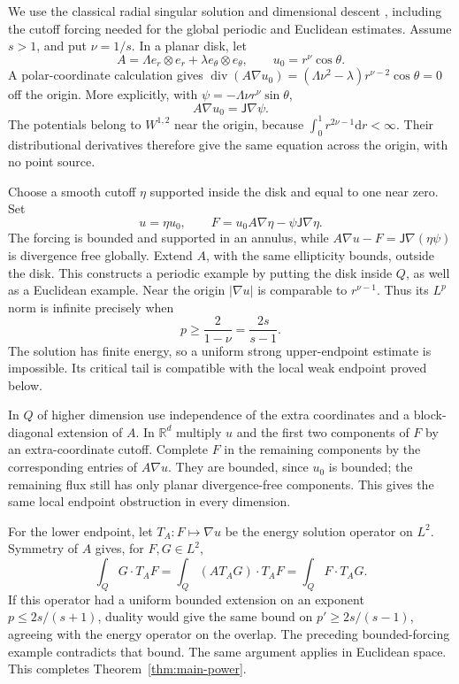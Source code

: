 \documentclass[11pt,a4paper]{article}
\numberwithin{equation}{section}
\theoremstyle{definition}
\theoremstyle{remark}\newtheorem{remark}[theorem]{Remark}
\DeclareMathOperator{\diver}{div}
\newcommand{\R}{\mathbb R}
\newcommand{\Rot}{\mathsf J}
\begin{document}
We use the classical radial singular solution and dimensional descent
\cite[Section~5]{Meyers1963}, including the cutoff forcing needed for
the global periodic and Euclidean estimates.
Assume \(s>1\), and put \(\nu=1/s\). In a planar disk, let
\[
 A=\Lambda e_r\otimes e_r+\lambda e_\theta\otimes e_\theta,
 \qquad u_0=r^\nu\cos\theta.
\]
A polar-coordinate calculation gives
\(\diver(A\nabla u_0)=
(\Lambda\nu^2-\lambda)r^{\nu-2}\cos\theta=0\)
off the origin. More explicitly, with
\(\psi=-\Lambda\nu r^\nu\sin\theta\),
\[
 A\nabla u_0=\Rot\nabla\psi.
\]
The potentials belong to \(W^{1,2}\) near the origin, because
\(\int_0^1r^{2\nu-1}\mathrm dr<\infty\).
Their distributional derivatives therefore give the same equation
across the origin, with no point source.

Choose a smooth cutoff \(\eta\) supported inside the disk and equal
to one near zero. Set
\begin{equation}\label{eq:endpoint-forcing}
 u=\eta u_0,\qquad
 F=u_0A\nabla\eta-\psi\Rot\nabla\eta.
\end{equation}
The forcing is bounded and supported in an annulus, while
\(A\nabla u-F=\Rot\nabla(\eta\psi)\) is divergence free globally.
Extend \(A\), with the same ellipticity bounds, outside the disk.
This constructs a periodic example by putting the disk inside \(Q\),
as well as a Euclidean example.
Near the origin \(|\nabla u|\) is comparable to \(r^{\nu-1}\).
Thus its \(L^p\) norm is infinite precisely when
\[
 p\geq\frac2{1-\nu}=\frac{2s}{s-1}.
\]
The solution has finite energy, so a uniform strong upper-endpoint
estimate is impossible. Its critical tail is compatible with the
local weak endpoint proved below.

In \(Q\) of higher dimension use independence of the extra coordinates
and a block-diagonal extension of \(A\). In \(\R^d\) multiply \(u\)
and the first two components of \(F\) by an extra-coordinate cutoff.
Complete \(F\) in the remaining components by the corresponding
entries of \(A\nabla u\). They are bounded, since \(u_0\) is bounded;
the remaining flux still has only planar divergence-free components.
This gives the same local endpoint obstruction in every dimension.

For the lower endpoint, let \(T_A:F\mapsto\nabla u\) be the energy
solution operator on \(L^2\). Symmetry of \(A\) gives, for \(F,G\in L^2\),
\[
 \int_QG\cdot T_AF=\int_Q(A T_AG)\cdot T_AF
                  =\int_QF\cdot T_AG.
\]
If this operator had a uniform bounded extension on an exponent
\(p\leq2s/(s+1)\), duality would give the same bound on
\(p'\geq2s/(s-1)\), agreeing with the energy operator on the overlap.
The preceding bounded-forcing example contradicts that bound.
The same argument applies in Euclidean space. This completes
Theorem~\ref{thm:main-power}.
\end{document}
